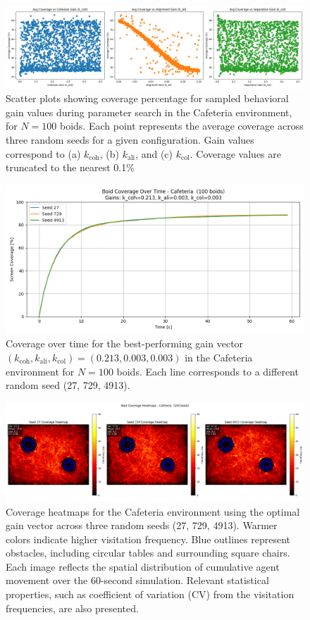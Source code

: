 \documentclass[12pt]{article}
\begin{document}
\begin{figure}[h!]
\centering
\includegraphics[width=\linewidth]{pics/cov_vs_gains/cafeteria_100.png}
\caption{Scatter plots showing coverage percentage for sampled behavioral gain values during parameter search in the Cafeteria environment, for \(N = 100\) boids. Each point represents the average coverage across three random seeds for a given configuration. Gain values correspond to (a) \(k_\text{coh}\), (b) \(k_\text{ali}\), and (c) \(k_\text{col}\). Coverage values are truncated to the nearest 0.1\%}
\label{fig:gains}
\end{figure}

\begin{figure}[h!]
    \centering
    \includegraphics[width=0.7\linewidth]{optimal_cov_vs_time/cafeteria_100.png}
    \caption{Coverage over time for the best-performing gain vector \((k_\text{coh}, k_\text{ali}, k_\text{col}) = (0.213,0.003,0.003)\) in the Cafeteria environment for \(N = 100\) boids. Each line corresponds to a different random seed (27, 729, 4913).}
    \label{fig:caf_cov}
  \end{figure}

\begin{figure}[h!]
\centering
\includegraphics[width=\linewidth]{heatmaps/cafeteria_100.png}
\caption{Coverage heatmaps for the Cafeteria environment using the optimal gain vector across three random seeds (27, 729, 4913). Warmer colors indicate higher visitation frequency. Blue outlines represent obstacles, including circular tables and surrounding square chairs. Each image reflects the spatial distribution of cumulative agent movement over the 60-second simulation. Relevant statistical properties, such as coefficient of variation (CV) from the visitation frequencies, are also presented.}
\label{fig:caf_heatmap}
\end{figure}
\end{document}
